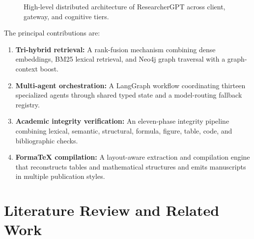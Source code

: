 \documentclass[conference]{IEEEtran}
\begin{document}
\begin{figure}[!t]
{}
\caption{High-level distributed architecture of ResearcherGPT across client, gateway, and cognitive tiers.}
\label{fig:architecture}
\end{figure}

The principal contributions are:
\begin{enumerate}
\item \textbf{Tri-hybrid retrieval:} A rank-fusion mechanism combining dense embeddings, BM25 lexical retrieval, and Neo4j graph traversal with a graph-context boost.
\item \textbf{Multi-agent orchestration:} A LangGraph workflow coordinating thirteen specialized agents through shared typed state and a model-routing fallback registry.
\item \textbf{Academic integrity verification:} An eleven-phase integrity pipeline combining lexical, semantic, structural, formula, figure, table, code, and bibliographic checks.
\item \textbf{FormaTeX compilation:} A layout-aware extraction and compilation engine that reconstructs tables and mathematical structures and emits manuscripts in multiple publication styles.
\end{enumerate}

\section{Literature Review and Related Work}
\end{document}
